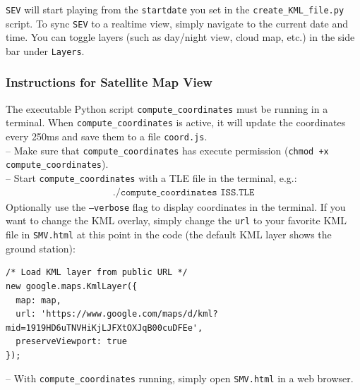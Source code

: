 \documentclass[10pt,a4paper]{article}
\begin{document}
\noindent \texttt{SEV} will start playing from the \texttt{startdate} you set in the \texttt{create\_KML\_file.py} script. To sync \texttt{SEV} to a realtime view, simply navigate to the current date and time. You can toggle layers (such as day/night view, cloud map, etc.) in the side bar under \texttt{Layers}.

\subsubsection{Instructions for Satellite Map View}
The executable Python script \texttt{compute\_coordinates} must be running in a terminal. When \texttt{compute\_coordinates} is active, it will update the coordinates every 250ms and save them to a file \texttt{coord.js}.\\
-- Make sure that \texttt{compute\_coordinates} has execute permission (\texttt{chmod +x compute\_coordinates}).\\
-- Start \texttt{compute\_coordinates} with a TLE file in the terminal, e.g.:
\begin{align*}
\texttt{./compute\_coordinates ISS.TLE}
\end{align*}
Optionally use the \texttt{--verbose} flag to display coordinates in the terminal. If you want to change the KML overlay, simply change the \texttt{url} to your favorite KML file in \texttt{SMV.html} at this point in the code (the default KML layer shows the ground station):
\begin{verbatim}
/* Load KML layer from public URL */
new google.maps.KmlLayer({
  map: map,
  url: 'https://www.google.com/maps/d/kml?mid=1919HD6uTNVHiKjLJFXtOXJqB00cuDFEe',
  preserveViewport: true
});
\end{verbatim}
\noindent -- With \texttt{compute\_coordinates} running, simply open \texttt{SMV.html} in a web browser.
\end{document}
